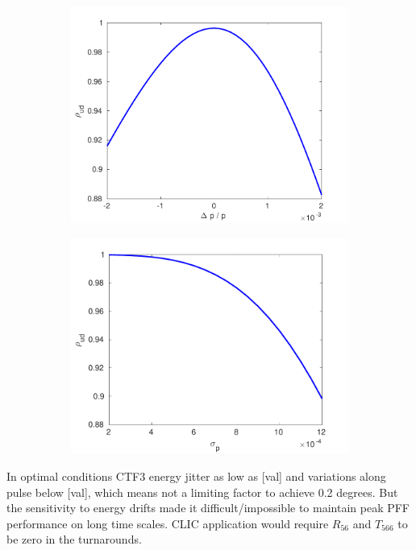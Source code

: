 \documentclass[%
 reprint,
 superscriptaddress,
 amsmath,
 amssymb,
 prstab,
]{revtex4-1}
\begin{document}
\begin{figure}
	\begin{subfigure}{\columnwidth}
		\includegraphics[width=\textwidth]{figs/prop/corrVsEnergyOffset}
		\caption{}
		\label{f:corrVsEnergyOffset}
	\end{subfigure}
	\begin{subfigure}{\columnwidth}
		\includegraphics[width=\textwidth]{figs/prop/maxCorrWithT566}
		\caption{}
		\label{f:maxCorrWithT566}
	\end{subfigure}
\end{figure}

In optimal conditions CTF3 energy jitter as low as [val] and variations along 
pulse below [val], which means not a limiting factor to achieve 0.2 degrees. 
But the sensitivity to energy drifts made it difficult/impossible to maintain 
peak PFF performance on long time scales. CLIC application would require 
\(R_{56}\) and \(T_{566}\) to be zero in the turnarounds.
\end{document}
